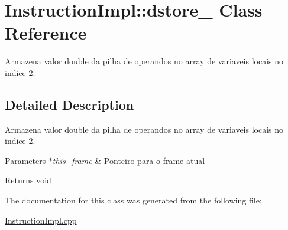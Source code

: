 \hypertarget{class_instruction_impl_1_1dstore__2}{}\section{Instruction\+Impl\+:\+:dstore\+\_ Class Reference}
\label{class_instruction_impl_1_1dstore__2}


Armazena valor double da pilha de operandos no array de variaveis locais no indice 2.  




\subsection{Detailed Description}
Armazena valor double da pilha de operandos no array de variaveis locais no indice 2. 


\begin{DoxyParams}{Parameters}
{\em $\ast$this\+\_\+frame} & Ponteiro para o frame atual \\
\hline
\end{DoxyParams}
\begin{DoxyReturn}{Returns}
void 
\end{DoxyReturn}


The documentation for this class was generated from the following file\+:\begin{DoxyCompactItemize}
\item 
\hyperlink{_instruction_impl_8cpp}{Instruction\+Impl.\+cpp}\end{DoxyCompactItemize}
